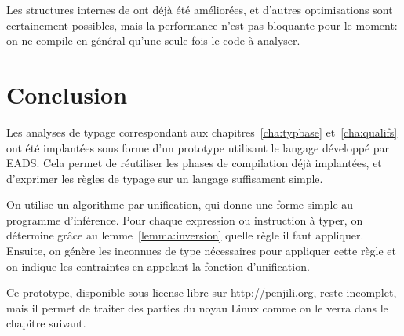 Les structures internes de \ctonewspeak ont déjà été améliorées, et d'autres
optimisations sont certainement possibles, mais la performance n'est pas
bloquante pour le moment: on ne compile en général qu'une seule fois le code à
analyser.

\section*{Conclusion}

Les analyses de typage correspondant aux chapitres~\ref{cha:typbase}
et~\ref{cha:qualifs} ont été implantées sous forme d'un prototype utilisant le
langage \newspeak développé par EADS. Cela permet de réutiliser les phases de
compilation déjà implantées, et d'exprimer les règles de typage sur un langage
suffisament simple.

On utilise un algorithme par unification, qui donne une forme simple au
programme d'inférence. Pour chaque expression ou instruction à typer, on
détermine grâce au lemme~\ref{lemma:inversion} quelle règle il faut appliquer.
Ensuite, on génère les inconnues de type nécessaires pour appliquer cette règle
et on indique les contraintes en appelant la fonction d'unification.

Ce prototype, disponible sous license libre sur \url{http://penjili.org}, reste
incomplet, mais il permet de traiter des parties du noyau Linux comme on le
verra dans le chapitre suivant.

